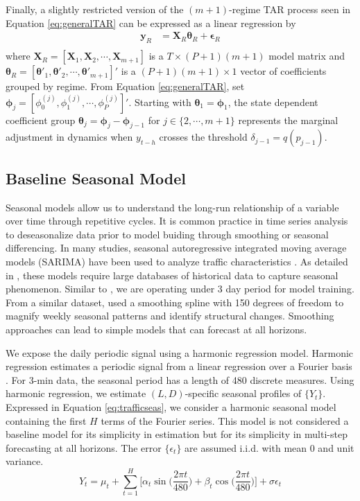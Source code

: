 Finally, a slightly restricted version of the $(m+1)$-regime TAR process seen in Equation \ref{eq:generalTAR} can be expressed as a linear regression by
\begin{equation}
\label{eq:hdlinmod}
\begin{split}
\bm{y}_R &=\bm{X}_R\bm{\theta}_R+\bm{\epsilon}_R \\
\end{split}
\end{equation}
where $\bm{X}_R=[\bm{X}_1,\bm{X}_2,\cdots,\bm{X}_{m+1}]$ is a $T\times (P+1)(m+1)$ model matrix and $\bm{\theta}_R=[\bm{\theta}'_{1},\bm{\theta}'_2,\cdots,\bm{\theta}'_{m+1}]'$ is a $(P+1)(m+1) \times 1$ vector of coefficients grouped by regime. From Equation \ref{eq:generalTAR}, set $\bm{\phi}_j=[\phi^{(j)}_0,\phi^{(j)}_1,\cdots,\phi^{(j)}_P]'$. Starting with $\bm{\theta}_1=\bm{\phi}_1$, the state dependent coefficient group $\bm{\theta}_j=\bm{\phi}_{j}-\bm{\phi}_{j-1}$ for $j \in \{2,\cdots,m+1\}$ represents the marginal adjustment in dynamics when $y_{t-h}$ crosses the threshold $\delta_{j-1}=q(p_{j-1})$.

\subsection{Baseline Seasonal Model}
Seasonal models allow us to understand the long-run relationship of a variable over time through repetitive cycles. It is common practice in time series analysis to deseasonalize data prior to model buiding through smoothing or seasonal differencing. In many studies, seasonal autoregressive integrated moving average models (SARIMA) have been used to analyze traffic characteristics \citep{Williams2003, Ghosh2005, Zhang2011}. As detailed in \cite{Kumar2015}, these models require large databases of historical data to capture seasonal phenomenon. Similar to \cite{Kumar2015}, we are operating under 3 day period for model training. From a similar dataset, \cite{Kamarianakis2010} used a smoothing spline with 150 degrees of freedom to magnify weekly seasonal patterns and identify structural changes. Smoothing approaches can lead to simple models that can forecast at all horizons.

We expose the daily periodic signal using a harmonic regression model. Harmonic regression estimates a periodic signal from a linear regression over a Fourier basis \citep{Metcalfe2009}. For 3-min data, the seasonal period has a length of 480 discrete measures. Using harmonic regression, we estimate $(L,D)$-specific seasonal profiles of $\{Y_t\}$. Expressed in Equation \ref{eq:trafficseas}, we consider a harmonic seasonal model containing the first $H$ terms of the Fourier series.  This model is not considered a baseline model for its simplicity in estimation but for its simplicity in multi-step forecasting at all horizons. The error $\{\epsilon_t\}$ are assumed i.i.d. with mean 0 and unit variance.
\begin{equation}
\label{eq:trafficseas}
Y_{t}=\mu_{t}+\sum\limits_{t=1}^{H} \Big[\alpha_{t}\sin\Big(\frac{2\pi t}{480}\Big)+\beta_{t}\cos\Big(\frac{2\pi t}{480}\Big)\Big]+\sigma\epsilon_{t}
\end{equation}

